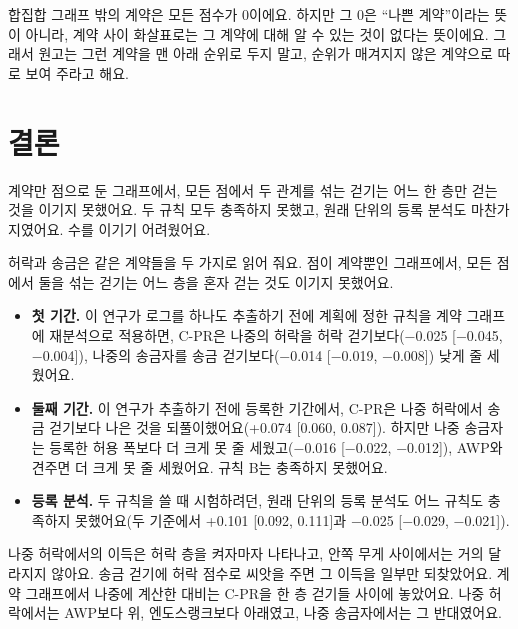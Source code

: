 \begin{puri}
합집합 그래프 밖의 계약은 모든 점수가 0이에요. 하지만 그 0은 “나쁜 계약”이라는 뜻이 아니라, 계약 사이 화살표로는 그 계약에 대해 알 수 있는 것이 없다는 뜻이에요. 그래서 원고는 그런 계약을 맨 아래 순위로 두지 말고, 순위가 매겨지지 않은 계약으로 따로 보여 주라고 해요.
\end{puri}

\section{결론}
\label{sec:conclusion}

\begin{yoji}
계약만 점으로 둔 그래프에서, 모든 점에서 두 관계를 섞는 걷기는 어느 한 층만 걷는 것을 이기지 못했어요. 두 규칙 모두 충족하지 못했고, 원래 단위의 등록 분석도 마찬가지였어요. 수를 이기기 어려웠어요.
\end{yoji}

허락과 송금은 같은 계약들을 두 가지로 읽어 줘요. 점이 계약뿐인 그래프에서, 모든 점에서 둘을 섞는 걷기는 어느 층을 혼자 걷는 것도 이기지 못했어요.
\begin{itemize}
\item \textbf{첫 기간.} 이 연구가 로그를 하나도 추출하기 전에 계획에 정한 규칙을 계약 그래프에 재분석으로 적용하면, C-PR은 나중의 허락을 허락 걷기보다(−0.025 [−0.045, −0.004]), 나중의 송금자를 송금 걷기보다(−0.014 [−0.019, −0.008]) 낮게 줄 세웠어요.
\item \textbf{둘째 기간.} 이 연구가 추출하기 전에 등록한 기간에서, C-PR은 나중 허락에서 송금 걷기보다 나은 것을 되풀이했어요(+0.074 [0.060, 0.087]). 하지만 나중 송금자는 등록한 허용 폭보다 더 크게 못 줄 세웠고(−0.016 [−0.022, −0.012]), AWP와 견주면 더 크게 못 줄 세웠어요. 규칙 B는 충족하지 못했어요.
\item \textbf{등록 분석.} 두 규칙을 쓸 때 시험하려던, 원래 단위의 등록 분석도 어느 규칙도 충족하지 못했어요(두 기준에서 +0.101 [0.092, 0.111]과 −0.025 [−0.029, −0.021]).
\end{itemize}

나중 허락에서의 이득은 허락 층을 켜자마자 나타나고, 안쪽 무게 사이에서는 거의 달라지지 않아요. 송금 걷기에 허락 점수로 씨앗을 주면 그 이득을 일부만 되찾았어요. 계약 그래프에서 나중에 계산한 대비는 C-PR을 한 층 걷기들 사이에 놓았어요. 나중 허락에서는 AWP보다 위, 엔도스랭크보다 아래였고, 나중 송금자에서는 그 반대였어요.

